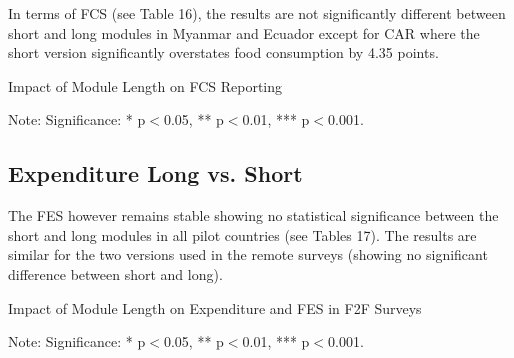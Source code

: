 \documentclass[11pt,harvard]{article}
\begin{document}
In terms of FCS (see Table 16), the results are not significantly different between short and long modules in Myanmar and Ecuador except for CAR where the short version significantly overstates food consumption by 4.35 points.

\begin{table}[htbp]
	\centering
	\begin{adjustbox}{max width=\textwidth}
		\begin{threeparttable}
			\caption{Impact of Module Length on FCS Reporting}
			\scriptsize
			 
			\label{tab:FCS_F2F_Form_Length_All_Country}
			\begin{tablenotes}
				\item Note: Significance: * p$<$0.05, ** p$<$0.01, *** p$<$0.001. 
			\end{tablenotes}
		\end{threeparttable}
	\end{adjustbox}
\end{table}

\subsection{Expenditure Long vs. Short}

The FES however remains stable showing no statistical significance between the short and long modules in all pilot countries (see Tables 17). The results are similar for the two versions used in the remote surveys (showing no significant difference between short and long).

\begin{table}[htbp]
	\centering
	\begin{adjustbox}{max width=\textwidth}
		\begin{threeparttable}
			\caption{Impact of Module Length on Expenditure and FES in F2F Surveys}
			\scriptsize
			 
			\label{tab:FES_F2F_Form_Length_All_Country}
			\begin{tablenotes}
				\item Note: Significance: * p$<$0.05, ** p$<$0.01, *** p$<$0.001. 
			\end{tablenotes}
		\end{threeparttable}
	\end{adjustbox}
\end{table}
\end{document}
